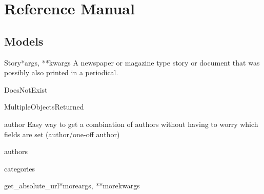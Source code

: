 \documentclass[letterpaper,10pt,english]{manual}
\begin{document}
\hypertarget{reference-index}{}\chapter{Reference Manual}

\resetcurrentobjects
\hypertarget{--doc-reference/models}{}

\hypertarget{reference-models}{}\section{Models}
\hypertarget{module-stories.models}{}
\modulesynopsis{}

\hypertarget{stories.models.Story}{}\begin{classdesc}{Story}{*args, **kwargs}
A newspaper or magazine type story or document that was possibly also printed
in a periodical.

\hypertarget{stories.models.Story.DoesNotExist}{}\begin{excdesc}{DoesNotExist}\end{excdesc}

\hypertarget{stories.models.Story.MultipleObjectsReturned}{}\begin{excdesc}{MultipleObjectsReturned}\end{excdesc}

\hypertarget{stories.models.Story.author}{}\begin{memberdesc}[Story]{author}
Easy way to get a combination of authors without having to worry which
fields are set (author/one-off author)
\end{memberdesc}

\hypertarget{stories.models.Story.authors}{}\begin{memberdesc}[Story]{authors}\end{memberdesc}

\hypertarget{stories.models.Story.categories}{}\begin{memberdesc}[Story]{categories}\end{memberdesc}

\hypertarget{stories.models.Story.get\_absolute\_url}{}\begin{methoddesc}[Story]{get\_absolute\_url}{*moreargs, **morekwargs}\end{methoddesc}


\end{classdesc}
\end{document}

